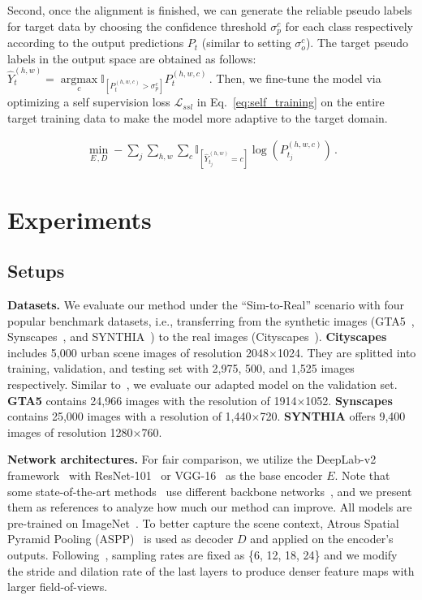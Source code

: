 \documentclass[runningheads]{llncs}
\newcommand{\Lm}{\mathcal{L}}
\begin{document}
Second, once the alignment is finished, we can generate the reliable pseudo labels for target data by choosing the confidence threshold $\sigma_p^c$ for each class respectively according to the output predictions $P_t$ (similar to setting $\sigma_o^c$). The target pseudo labels in the output space are obtained as follows: $\hat{Y}_t^{(h,w)} = \mathop{\arg\max}\limits_{c} \mathbb{I}_{[P_t^{(h,w,c)}>\sigma_p^c]} P_t^{(h, w,c)}\,.$
Then, we fine-tune the model via optimizing a self supervision loss $\Lm_{ssl}$ in Eq.~\eqref{eq:self_training} on the entire target training data to make the model more adaptive to the target domain.
 \begin{small}
    \begin{align}
        \mathop{\min}\limits_{E\,,D} -\sum_{j} \sum_{h,w} \sum_{c} \mathbb{I}_{[\hat{Y}_{t_j}^{(h,w)}=c]} \log\left(P_{t_j}^{(h,w,c)}\right) \,.
        \label{eq:self_training}
    \end{align}
\end{small}




\section{Experiments}
\subsection{Setups}
\textbf{Datasets.} We evaluate our method under the ``Sim-to-Real'' scenario with four popular benchmark datasets, i.e., transferring from the synthetic images (GTA5~\cite{stephan2016gtav}, Synscapes~\cite{wrenninge2018synscapes}, and SYNTHIA~\cite{ros2016synthia}) to the real images (Cityscapes~\cite{Cordts2016Cityscapes}). {\bf Cityscapes} includes 5,000 urban scene images of resolution 2048$\times$1024. They are splitted into training, validation, and testing set with 2,975, 500, and 1,525 images respectively. Similar to~\cite{tsai2018learning,zou2019confidence}, we evaluate our adapted model on the validation set.
{\bf GTA5} contains 24,966 images with the resolution of 1914$\times$1052. {\bf Synscapes} contains 25,000 images with a resolution of 1,440$\times$720. {\bf SYNTHIA} offers 9,400 images of resolution 1280$\times$760. 

\textbf{Network architectures.} For fair comparison, we utilize the DeepLab-v2 framework~\cite{chen2018deeplab} with ResNet-101~\cite{he2016deep} or VGG-16~\cite{simonyan2015vgg} as the base encoder $E$. Note that some state-of-the-art methods~\cite{lian2019pycda,zhang2019category} use different backbone networks~\cite{chen2018encoderdecoder,zhao2017pspnet}, and we present them as references to analyze how much our method can improve. All models are pre-trained on ImageNet~\cite{deng2009imagenet}. To better capture the scene context, Atrous Spatial Pyramid Pooling (ASPP)~\cite{chen2018deeplab} is used as decoder $D$ and applied on the encoder's outputs. Following~\cite{luo2019taking,tsai2018learning,zou2019confidence}, sampling rates are fixed as \{6, 12, 18, 24\} and we modify the stride and dilation rate of the last layers to produce denser feature maps with larger field-of-views.
\end{document}
